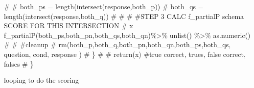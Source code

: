 \documentclass[
  letterpaper,
  DIV=11,
  numbers=noendperiod]{scrreprt}
\newenvironment{Shaded}{\begin{snugshade}}{\end{snugshade}}
\newcommand{\CommentTok}[1]{\textcolor[rgb]{0.37,0.37,0.37}{#1}}
\begin{document}
\begin{Shaded}
\begin{Highlighting}[]
\CommentTok{\#   }
\CommentTok{\#     both\_ps = length(intersect(response,both\_p))}
\CommentTok{\#     both\_qs = length(intersect(response,both\_q))}
\CommentTok{\#   }
\CommentTok{\#  }
\CommentTok{\#   \#STEP 3 CALC f\_partialP schema SCORE FOR THIS INTERSECTION }
\CommentTok{\#   x = f\_partialP(both\_ps,both\_pn,both\_qs,both\_qn)\%\textgreater{}\% unlist() \%\textgreater{}\% as.numeric()}
\CommentTok{\#   }
\CommentTok{\#   \#cleanup}
\CommentTok{\#   rm(both\_p,both\_q,both\_pn,both\_qn,both\_ps,both\_qs, question, cond, response )   }
\CommentTok{\#   \}}
\CommentTok{\#   }
\CommentTok{\#   return(x) \#true correct, trues, false correct, falses}
\CommentTok{\# \}}
\end{Highlighting}
\end{Shaded}

looping to do the scoring
\end{document}
